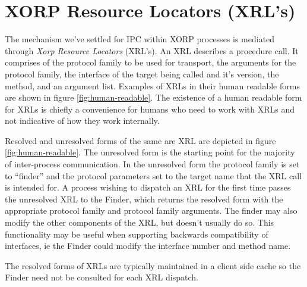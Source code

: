 \documentclass[11pt]{article}
\begin{document}
\section{XORP Resource Locators (XRL's)}

The mechanism we've settled for IPC within XORP processes is mediated
through \emph{Xorp Resource Locators} (XRL's).  An XRL describes a
procedure call.  It comprises of the protocol family to be used for
transport, the arguments for the protocol family, the interface of the
target being called and it's version, the method, and an argument
list.  Examples of XRLs in their human readable forms are shown in
figure \ref{fig:human-readable}.  The existence of a human readable
form for XRLs is chiefly a convenience for humans who need to work
with XRLs and not indicative of how they work internally.

Resolved and unresolved forms of the same are XRL are depicted in
figure \ref{fig:human-readable}.  The unresolved form is the starting
point for the majority of inter-process communication.  In the
unresolved form the protocol family is set to ``finder'' and the
protocol parameters set to the target name that the XRL call is
intended for.  A process wishing to dispatch an XRL for the first time
passes the unresolved XRL to the Finder, which returns the resolved
form with the appropriate protocol family and protocol family
arguments.  The finder may also modify the other components of the
XRL, but doesn't usually do so.  This functionality may be useful when
supporting backwards compatibility of interfaces, ie the Finder could
modify the interface number and method name.

The resolved forms of XRLs are typically maintained in a client side
cache so the Finder need not be consulted for each XRL dispatch.
\end{document}
